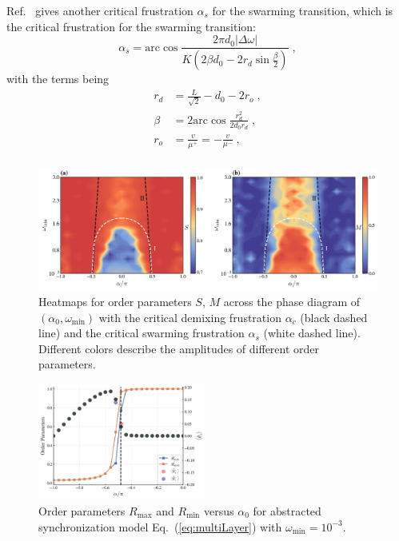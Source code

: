 \documentclass{article}
\begin{document}
Ref.~\cite{LU2025115794} gives another critical frustration $\alpha _s$ for the swarming transition, which is the critical frustration for the swarming transition:
\begin{equation}
    \label{eq:criticalFrustrationSwarming}
    \alpha _s=\mathrm{arc}\cos \frac{2\pi d_0\left| \Delta \omega \right|}{K\left( 2\beta d_0-2r_d\sin \frac{\beta}{2} \right)}\;,
\end{equation}
with the terms being
\begin{equation}
    \begin{aligned}
        r_d&=\frac{L}{\sqrt{2}}-d_0-2r_o\;,\\
        \beta &=2\mathrm{arc}\cos \frac{r_{d}^{2}}{2d_0r_d}\;,\\
        r_o&=\frac{v}{\mu ^+}=-\frac{v}{\mu ^-}\;,\\
    \end{aligned}
\end{equation}

\begin{figure}
    \includegraphics[width=\textwidth]{./figs/phaseDiagram.png}
    \caption{
        \label{fig:phaseDiagram} 
        Heatmaps for order parameters $S$, $M$ across the phase diagram of $(\alpha_0, \omega_{\min})$ with the critical demixing frustration $\alpha_{c}$ (black dashed line) and the critical swarming frustration $\alpha_{s}$ (white dashed line).
        Different colors describe the amplitudes of different order parameters.
    }
\end{figure}

\begin{figure}
    \includegraphics[width=0.49\textwidth]{./figs/SyncOPsAndRealFreq.png}
    \caption{
        \label{fig:SyncOPsAndRealFreq} 
        Order parameters $R_{\max}$ and $R_{\min}$ versus $\alpha_0$ for abstracted synchronization model Eq.~(\ref{eq:multiLayer}) with $\omega_{\min}=10^{-3}$.
    }
\end{figure}
\end{document}
